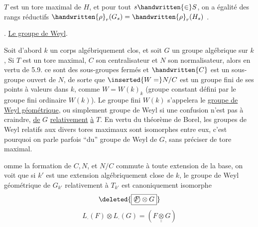   $T$ est un tore maximal de $H$, et  pour tout $s\handwritten{\in}S$, on a égalité des rangs réductifs $\handwritten{\rho}_{r}(G_{s})=\handwritten{\rho}_{r}(H_{s})$\handwritten{,} .

. \quad \uline{Le groupe de Weyl}.

Soit d'abord $k$ un corps algébriquement clos, et soit $G$ un groupe algébrique sur $k$,  Si $T$ est un tore maximal, $C$ son centralisateur et $N$ son normalisateur, alors en vertu de 5.9. ce sont des sous-groupes fermés   et $\handwritten{C}$ est un sous-groupe ouvert de $N$, de sorte que $\inserted{W=}N/C$ est un groupe fini   de  ses points à valeurs dans $k$, comme $W=W(k)_{k}$ (groupe constant défini par le groupe fini ordinaire $W(k)$).
Le groupe fini $W(k)$ s'appelera le \uline{groupe de Weyl géométrique}, \handwritten{(}ou simplement groupe de Weyl si une confusion n'est pas à craindre\handwritten{)}, \uline{de} $G$ \uline{relativement} \uline{à} $T$. En vertu du théorème de  Borel, les groupes de Weyl relatifs aux divers tores maximaux sont isomorphes entre eux, c'est pourquoi on parle parfois ``du'' groupe de Weyl de $G$, sans préciser de tore maximal. 

omme la formation de $C,N$, et $N/C$ commute à toute extension de la base, on voit que si $k'$ est une extension algébriquement close de $k$, le groupe de Weyl géométrique de $G_{k'}$ relativement à $T_{k'}$\handwritten{\unsure{/}} est canoniquement isomorphe
\[
\deleted{\boxed{\mathord{\text{\textcircled{\ensuremath{F}}}}\otimes G}}
\]
\[
L_{\cdot}(F)\otimes L_{\cdot}(G)=(F\mathbin{\underline{\underline{\otimes}}}G)
\]

